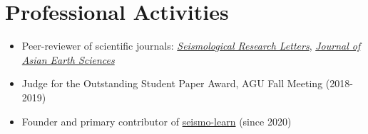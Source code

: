 \section{Professional Activities}

\begin{itemize}
\item Peer-reviewer of scientific journals:
      \textit{\href{https://pubs.geoscienceworld.org/srl/}{Seismological Research Letters}},
      \textit{\href{https://www.journals.elsevier.com/journal-of-asian-earth-sciences/}{Journal of Asian Earth Sciences}}
\item Judge for the Outstanding Student Paper Award, AGU Fall Meeting (2018-2019)
\item Founder and primary contributor of \href{https://seismo-learn.org/}{seismo-learn} (since 2020)
\end{itemize}
